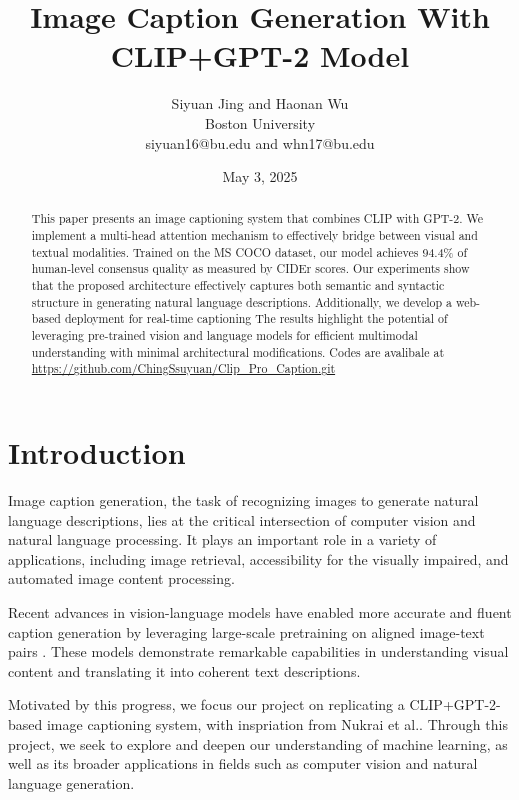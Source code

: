 \documentclass[11pt]{article}
\begin{document}
\title{Image Caption Generation With CLIP+GPT-2 Model}
\author{Siyuan Jing and Haonan Wu\\ Boston University \\ siyuan16@bu.edu and whn17@bu.edu}
\date{May 3, 2025}
\maketitle

\begin{abstract}
        This paper presents an image captioning system that combines CLIP with GPT-2.
        We implement a multi-head attention mechanism to effectively bridge between visual and textual modalities. 
        Trained on the MS COCO dataset, 
        our model achieves 94.4\% of human-level consensus quality as 
        measured by CIDEr scores. Our experiments show that the proposed architecture effectively 
        captures both semantic  and syntactic structure in generating natural language descriptions. Additionally, 
        we develop a web-based deployment for real-time captioning
        The results highlight the potential of leveraging pre-trained vision and language 
        models for efficient multimodal understanding with minimal architectural modifications. Codes are avalibale at \url{https://github.com/ChingSsuyuan/Clip_Pro_Caption.git}
\end{abstract}

\section{Introduction}
Image caption generation, the task of recognizing images to generate natural language descriptions, lies at the critical intersection of 
computer vision and natural language processing. 
It plays an important role in a variety of applications, including image retrieval, accessibility for the visually impaired, and automated image content processing.

Recent advances in vision-language models have enabled more accurate and 
fluent caption generation by leveraging large-scale pretraining on aligned image-text pairs 
. These models demonstrate remarkable capabilities in understanding visual content and 
translating it into coherent text descriptions.

Motivated by this progress, we focus our project on replicating a CLIP+GPT-2-based image captioning system, with inspriation from Nukrai et al.\cite{Nukrai2022}. Through this project, we seek to explore and deepen our understanding of 
machine learning, as well as its broader applications in fields such as computer vision and natural language generation.
\end{document}

